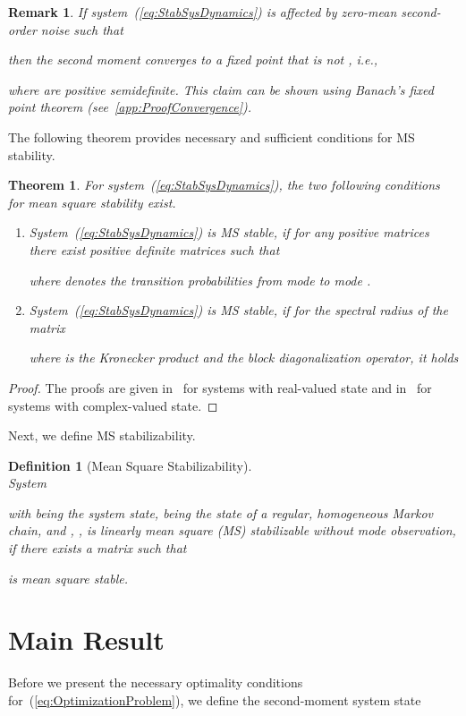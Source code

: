 \documentclass[preprint,1p,11pt]{IR-Template/ISAS_IR}
\newtheorem{theorem}{Theorem}
\newtheorem{remark}{Remark}
\newtheorem{definition}{Definition}
\newtheorem{proof}{Proof}
\begin{document}
\begin{remark}
If system~(\ref{eq:StabSysDynamics}) is affected by zero-mean second-order noise  such that

then the second moment  converges to a fixed point that is not , i.e.,

where  are positive semidefinite. This claim can be shown using Banach's fixed point theorem (see~\ref{app:ProofConvergence}).
\end{remark}

The following theorem provides necessary and sufficient conditions for MS stability.
\begin{theorem}
For system~(\ref{eq:StabSysDynamics}), the two following conditions for mean square stability exist.
\begin{enumerate}[label = \alph*)]
\item 
	System~(\ref{eq:StabSysDynamics}) is MS stable, if for any positive matrices  there exist positive definite matrices  such that

where  denotes the transition probabilities from mode  to mode .
\item
	System~(\ref{eq:StabSysDynamics}) is MS stable, if for the spectral radius  of the matrix

where  is the Kronecker product and  the block diagonalization operator, it holds

\end{enumerate}
\label{theor:MSS}
\end{theorem}
\begin{proof}
The proofs are given in~\cite{Morozan_1983,Fang_2002,Ling_2012} for systems with real-valued state and in~\cite{Costa_1993} for systems with complex-valued state.
\end{proof}

Next, we define MS stabilizability.
\begin{definition}[Mean Square Stabilizability]\hfill\\
System

with  being the system state,  being the state of a regular, homogeneous Markov chain, and , , is linearly mean square (MS) stabilizable without mode observation, if there exists a matrix  such that

is mean square stable.
\label{def:MSStab}
\end{definition}
    	
   \section{Main Result}
   	\label{sec:MainResult}
   	Before we present the necessary optimality conditions for~(\ref{eq:OptimizationProblem}), we define the second-moment system state
\end{document}
